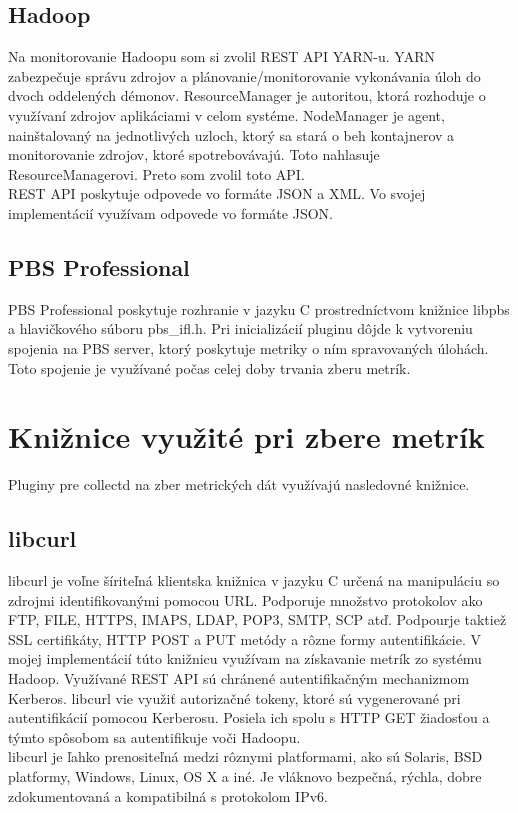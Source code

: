 \documentclass[printed,11pt,twoside,color,cover,table]{fithesis3}
\begin{document}
\subsection{Hadoop}
Na monitorovanie Hadoopu som si zvolil REST API YARN-u. YARN zabezpečuje správu zdrojov a plánovanie/monitorovanie vykonávania úloh do dvoch
oddelených démonov.\cite{hadoop-yarn} 
ResourceManager je autoritou, ktorá rozhoduje o využívaní zdrojov aplikáciami v celom systéme. NodeManager
je agent, nainštalovaný na jednotlivých uzloch, ktorý sa stará o beh kontajnerov a monitorovanie zdrojov, ktoré spotrebovávajú. Toto
nahlasuje ResourceManagerovi. Preto som zvolil toto API.
\\REST API poskytuje odpovede vo formáte JSON a XML. Vo svojej implementácií využívam odpovede vo formáte JSON.

\subsection{PBS Professional}
PBS Professional poskytuje rozhranie v jazyku C prostredníctvom knižnice libpbs a hlavičkového súboru pbs\_ifl.h. Pri inicializácií
pluginu dôjde k vytvoreniu spojenia na PBS server, ktorý poskytuje metriky o ním spravovaných úlohách. Toto spojenie je využívané
počas celej doby trvania zberu metrík.

\section{Knižnice využité pri zbere metrík}
Pluginy pre collectd na zber metrických dát využívajú nasledovné knižnice. 

\subsection{libcurl}
libcurl je voľne šíriteľná klientska knižnica v jazyku C určená na manipuláciu so zdrojmi identifikovanými pomocou URL. Podporuje
množstvo protokolov ako FTP, FILE, HTTPS, IMAPS, LDAP, POP3, SMTP, SCP atď. Podpourje taktiež SSL certifikáty,
HTTP POST a PUT metódy a rôzne formy autentifikácie. V mojej implementácií túto knižnicu využívam na získavanie metrík zo systému
Hadoop. Využívané REST API sú chránené autentifikačným mechanizmom Kerberos. libcurl vie využiť autorizačné tokeny,
ktoré sú vygenerované pri autentifikácií pomocou Kerberosu. Posiela ich spolu s HTTP GET žiadosťou a týmto spôsobom
sa autentifikuje voči Hadoopu.
\\libcurl je ľahko prenositeľná medzi rôznymi platformami, ako sú Solaris, BSD platformy, Windows, Linux, OS X a iné. Je vláknovo
bezpečná, rýchla, dobre zdokumentovaná a kompatibilná s protokolom IPv6. \cite{libcurl}
\end{document}

